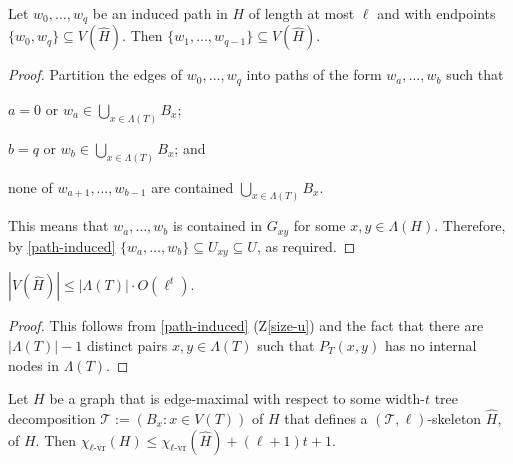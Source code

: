 \documentclass[kpfonts]{patmorin}
\newcommand{\rn}[1]{\chi_{\operatorname{#1-vr}}}
\newcommand{\lrn}{\rn{\ell}}
\theoremstyle{named}
\begin{document}
\begin{lem}\label{skeleton-paths}
    Let $w_0,\ldots,w_q$ be an induced path in $H$ of length at most $\ell$ and with endpoints $\{w_0,w_q\}\subseteq V(\hat{H})$. Then $\{w_1,\ldots,w_{q-1}\}\subseteq V(\hat{H})$.
\end{lem}

\begin{proof}
    Partition the edges of $w_0,\ldots,w_q$ into paths of the form $w_a,\ldots,w_b$ such that
    \begin{inparaenum}[(i)]
        \item $a=0$ or $w_a\in\bigcup_{x\in \Lambda(T)} B_x$;
        \item $b=q$ or $w_b\in\bigcup_{x\in \Lambda(T)} B_x$; and
        \item none of $w_{a+1},\ldots,w_{b-1}$ are contained $\bigcup_{x\in \Lambda(T)} B_x$.
    \end{inparaenum}
    This means that $w_a,\ldots,w_b$ is contained in $G_{xy}$ for some $x,y\in \Lambda(H)$.  Therefore, by \cref{path-induced} $\{w_a,\ldots,w_b\}\subseteq U_{xy}\subseteq U$, as required.
\end{proof}


\begin{lem}\label{skeleton-size}
    $|V(\hat{H})|\le |\Lambda(T)|\cdot O(\ell^t)$.
\end{lem}

\begin{proof}
    This follows from \cref{path-induced} (Z\ref{size-u}) and the fact that there are $|\Lambda(T)|-1$ distinct pairs $x,y\in\Lambda(T)$ such that $P_T(x,y)$ has no internal nodes in $\Lambda(T)$.
\end{proof}


\begin{lem}\label{skeleton-colour}
    Let $H$ be a graph that is edge-maximal with respect to some width-$t$ tree decomposition $\mathcal{T}:=(B_x:x\in V(T))$ of $H$ that defines a $(\mathcal{T},\ell)$-skeleton $\hat{H}$, of $H$.  Then $\lrn(H)\le \lrn(\hat{H}) + (\ell+1)t+1$.
\end{lem}
\end{document}
